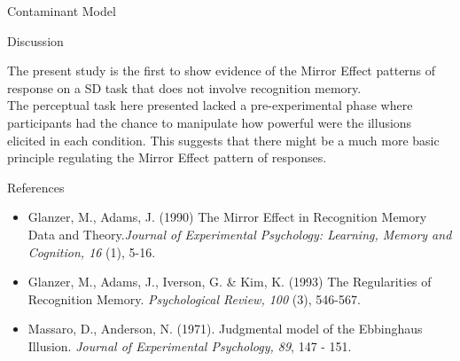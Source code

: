 \documentclass[final]{beamer}
\newlength{\onecolwid}
\begin{document}
\begin{frame}[t]
\begin{columns}[t]
\begin{column}{\onecolwid}
\begin{alertblock}{Contaminant Model}
\end{alertblock}



\begin{alertblock}{Discussion}

The present study is the first to show evidence of the Mirror Effect patterns of response on a SD task that does not involve recognition memory.\\

The perceptual task here presented lacked a pre-experimental phase where participants had the chance to manipulate how powerful were the illusions elicited in each condition. This suggests that there might be a much more basic principle regulating the Mirror Effect pattern of responses.

\end{alertblock}


\begin{alertblock}{References}

\begin{itemize}
\item Glanzer, M., Adams, J. (1990) The Mirror Effect in Recognition Memory \: Data and Theory.\textit{Journal of Experimental Psychology: Learning, Memory and Cognition, 16} (1), 5-16.
\item Glanzer, M., Adams, J., Iverson, G. \& Kim, K. (1993) The Regularities of Recognition Memory. \textit{Psychological Review, 100} (3), 546-567.
\item Massaro, D., Anderson, N. (1971). Judgmental model of the Ebbinghaus Illusion. \textit{Journal of Experimental Psychology, 89}, 147 - 151.
\end{itemize}


\end{alertblock}



\end{column} %
\end{columns} %
\end{frame} %
\end{document}
